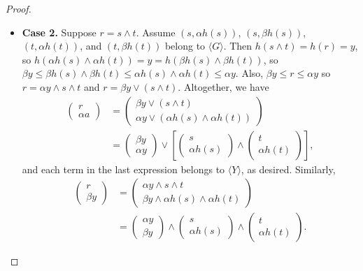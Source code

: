 \begin{proof}
\begin{itemize}
\item {\bf Case 2.} Suppose $r = s \wedge t$. Assume $(s, \alpha {h(s)})$, $(s, \beta{h(s)})$, $(t, \alpha {h(t)})$, and $(t, \beta{h(t)})$ belong to $\langle G \rangle$. Then $h(s\wedge t) = h(r) = y$, so 
$h(\alpha {h(s)} \wedge\alpha {h(t)}) = y = h(\beta {h(s)} \wedge\beta {h(t)})$, so
$\beta y \leqslant \beta h(s) \wedge \beta h(t) \leqslant \alpha {h(s)} \wedge \alpha {h(t)} \leqslant \alpha y$.
Also, $\beta y \leqslant r \leqslant \alpha y$ so $r = \alpha y \wedge s\wedge t$
and $r = \beta y \vee (s\wedge t)$. Altogether, we have
\begin{align*}
\left(\begin{array}{c} r \\ \alpha a\end{array}\right) &= 
\left(\begin{array}{c} \beta y \vee (s\wedge t) \\ \alpha y \vee (\alpha {h(s)} \wedge \alpha {h(t)}) \end{array}\right)\\
&= \left(\begin{array}{c} \beta y\\ \alpha y\end{array}\right) \vee
\left[\left(\begin{array}{c}s \\ \alpha {h(s)}\end{array}\right) \wedge \left(\begin{array}{c}t \\ \alpha {h(t)} \end{array}\right)\right],
\end{align*}
and each term in the last expression belongs to $\langle Y \rangle$, as desired.
Similarly,
\begin{align*}
\left(\begin{array}{c} r \\ \beta y\end{array}\right) &= 
\left(\begin{array}{c} \alpha y \wedge s\wedge t \\ \beta y \wedge \alpha {h(s)} \wedge \alpha {h(t)} \end{array}\right)\\
&= \left(\begin{array}{c} \alpha y\\ \beta y\end{array}\right) \wedge 
\left(\begin{array}{c}s \\ \alpha {h(s)}\end{array}\right) \wedge \left(\begin{array}{c}t \\ \alpha {h(t)} \end{array}\right).

\end{align*}
\end{itemize}
\end{proof}

